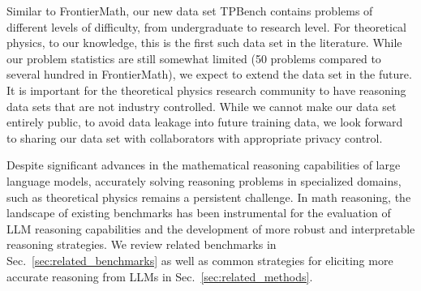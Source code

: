 Similar to FrontierMath, our new data set TPBench contains problems of different levels of difficulty, from undergraduate to research level. For theoretical physics, to our knowledge, this is the first such data set in the literature. While our problem statistics are still somewhat limited (50 problems compared to several hundred in FrontierMath), we expect to extend the data set in the future. It is important for the theoretical physics research community to have reasoning data sets that are not industry controlled. While we cannot make our data set entirely public, to avoid data leakage into future training data, we look forward to sharing our data set with collaborators with appropriate privacy control. 
\fi


Despite significant advances in the mathematical reasoning capabilities of large language models, accurately solving reasoning problems in specialized domains, such as theoretical physics remains a persistent challenge. In math reasoning, the landscape of existing benchmarks has been instrumental for the evaluation of LLM reasoning capabilities and the development of more robust and interpretable reasoning strategies. We review related benchmarks in Sec.~\ref{sec:related_benchmarks} as well as common strategies for eliciting more accurate reasoning from LLMs in Sec.~\ref{sec:related_methods}.

